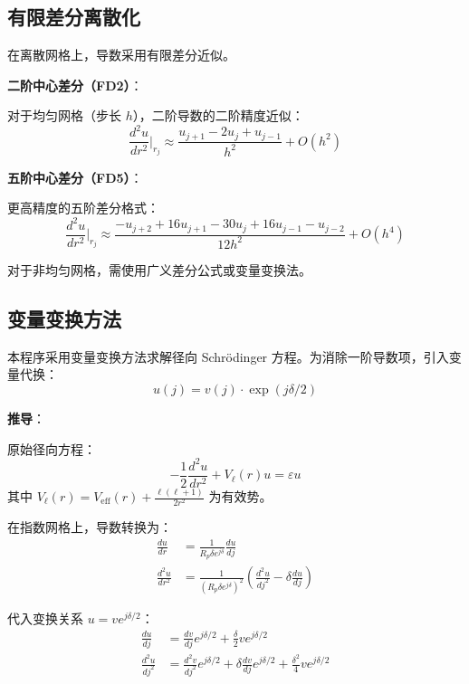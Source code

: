 \documentclass[12pt,a4paper]{article}
\begin{document}
\subsection{有限差分离散化}

在离散网格上，导数采用有限差分近似。

\textbf{二阶中心差分（FD2）}：

对于均匀网格（步长 $h$），二阶导数的二阶精度近似：
\begin{equation}
    \frac{d^2u}{dr^2} \bigg|_{r_j} \approx \frac{u_{j+1} - 2u_j + u_{j-1}}{h^2} + O(h^2)
\end{equation}

\textbf{五阶中心差分（FD5）}：

更高精度的五阶差分格式：
\begin{equation}
    \frac{d^2u}{dr^2} \bigg|_{r_j} \approx \frac{-u_{j+2} + 16u_{j+1} - 30u_j + 16u_{j-1} - u_{j-2}}{12h^2} + O(h^4)
\end{equation}

对于非均匀网格，需使用广义差分公式或变量变换法。

\subsection{变量变换方法}

本程序采用变量变换方法求解径向 Schrödinger 方程。为消除一阶导数项，引入变量代换：
\begin{equation}
    u(j) = v(j) \cdot \exp(j\delta/2)
\end{equation}

\textbf{推导}：

原始径向方程：
\begin{equation}
    -\frac{1}{2}\frac{d^2u}{dr^2} + V_{\ell}(r) u = \varepsilon u
\end{equation}
其中 $V_{\ell}(r) = V_{\text{eff}}(r) + \frac{\ell(\ell+1)}{2r^2}$ 为有效势。

在指数网格上，导数转换为：
\begin{align}
    \frac{du}{dr}     & = \frac{1}{R_p \delta e^{j\delta}} \frac{du}{dj}                                               \\
    \frac{d^2u}{dr^2} & = \frac{1}{(R_p \delta e^{j\delta})^2} \left( \frac{d^2u}{dj^2} - \delta \frac{du}{dj} \right)
\end{align}

代入变换关系 $u = v e^{j\delta/2}$：
\begin{align}
    \frac{du}{dj}     & = \frac{dv}{dj} e^{j\delta/2} + \frac{\delta}{2} v e^{j\delta/2}                                            \\
    \frac{d^2u}{dj^2} & = \frac{d^2v}{dj^2} e^{j\delta/2} + \delta \frac{dv}{dj} e^{j\delta/2} + \frac{\delta^2}{4} v e^{j\delta/2}
\end{align}
\end{document}
